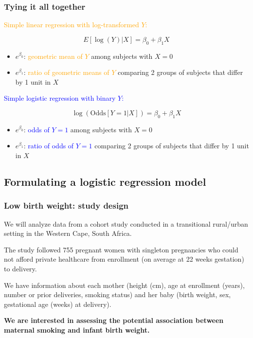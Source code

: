 \documentclass[12pt, 
hyperref={colorlinks=true, linkcolor=blue, urlcolor=cyan}]{beamer}
\begin{document}
\begin{frame}
\frametitle{Tying it all together}

\textcolor{orange}{Simple linear regression with log-transformed $Y$:} \begin{small}$$E[\log(Y)|X] = \beta_0 + \beta_1 X$$\end{small} \vspace{-0.8cm}
\begin{itemize}
\item $e^{\beta_0}$: \textcolor{orange}{geometric mean of $Y$} among subjects with $X = 0$
\item $e^{\beta_1}$: \textcolor{orange}{ratio of geometric means of $Y$} comparing 2 groups of subjects that differ by 1 unit in $X$
\end{itemize}

\textcolor{blue}{Simple logistic regression with binary $Y$:} \begin{small}$$\log\left(\text{Odds}[Y=1|X]\right) = \beta_0 + \beta_1 X$$ \end{small}\vspace{-0.8cm}
\begin{itemize}
\item $e^{\beta_0}$: \textcolor{blue}{odds of $Y=1$} among subjects with $X = 0$
\item $e^{\beta_1}$: \textcolor{blue}{ratio of odds of $Y=1$} comparing 2 groups of subjects that differ by 1 unit in $X$
\end{itemize}

\end{frame}

\subsection{Formulating a logistic regression model}
\begin{frame}
\frametitle{Low birth weight: study design}

We will analyze data from a cohort study conducted in a transitional rural/urban setting in the Western Cape, South Africa. 

The study followed 755 pregnant women with singleton pregnancies who could not afford private healthcare from enrollment (on average at 22 weeks gestation) to delivery. 

We have information about each mother (height (cm), age at enrollment (years), number or prior deliveries, smoking status) and her baby (birth weight, sex, gestational age (weeks) at delivery).

\textbf{We are interested in assessing the potential association between maternal smoking and infant birth weight.}
\end{frame}
\end{document}
